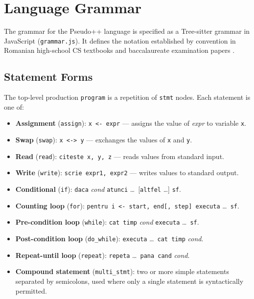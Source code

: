 \section{Language Grammar}
\label{sec:grammar}

The grammar for the Pseudo++ language is specified as a Tree-sitter
\cite{treesitter} grammar in JavaScript (\texttt{grammar.js}).  It defines
the notation established by convention in Romanian high-school CS textbooks
and baccalaureate examination papers \cite{romanian-curriculum}.

\subsection{Statement Forms}

The top-level production \texttt{program} is a repetition of \texttt{stmt}
nodes.  Each statement is one of:

\begin{itemize}
  \item \textbf{Assignment} (\texttt{assign}):
        \texttt{x <- expr} --- assigns the value of \textit{expr} to variable
        \texttt{x}.
  \item \textbf{Swap} (\texttt{swap}):
        \texttt{x <-> y} --- exchanges the values of \texttt{x} and \texttt{y}.
  \item \textbf{Read} (\texttt{read}):
        \texttt{citeste x, y, z} --- reads values from standard input.
  \item \textbf{Write} (\texttt{write}):
        \texttt{scrie expr1, expr2} --- writes values to standard output.
  \item \textbf{Conditional} (\texttt{if}):
        \texttt{daca} \textit{cond} \texttt{atunci} \ldots\
        [\texttt{altfel} \ldots] \texttt{sf}.
  \item \textbf{Counting loop} (\texttt{for}):
        \texttt{pentru i <- start, end[, step] executa} \ldots\ \texttt{sf}.
  \item \textbf{Pre-condition loop} (\texttt{while}):
        \texttt{cat timp} \textit{cond} \texttt{executa} \ldots\ \texttt{sf}.
  \item \textbf{Post-condition loop} (\texttt{do\_while}):
        \texttt{executa} \ldots\ \texttt{cat timp} \textit{cond}.
  \item \textbf{Repeat-until loop} (\texttt{repeat}):
        \texttt{repeta} \ldots\ \texttt{pana cand} \textit{cond}.
  \item \textbf{Compound statement} (\texttt{multi\_stmt}): two or more simple
        statements separated by semicolons, used where only a single statement
        is syntactically permitted.
\end{itemize}

